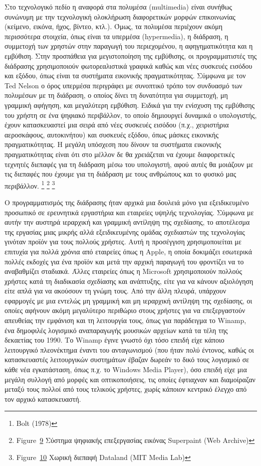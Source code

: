 \documentclass[
]{article}
\begin{document}
Στο τεχνολογικό πεδίο η αναφορά στα πολυμέσα (multimedia) είναι συνήθως
συνώνυμη με την τεχνολογική ολοκλήρωση διαφορετικών μορφών επικοινωνίας
(κείμενο, εικόνα, ήχος, βίντεο, κτλ.). Όμως, τα πολυμέσα περιέχουν ακόμη
περισσότερα στοιχεία, όπως είναι τα υπερμέσα (hypermedia), η διάδραση, η
συμμετοχή των χρηστών στην παραγωγή του περιεχομένου, η αφηγηματικότητα
και η εμβύθιση. Στην προσπάθεια για μεγιστοποίηση της εμβύθισης, οι
προγραμματιστές της διάδρασης χρησιμοποιούν φωτορεαλιστικά γραφικά καθώς
και νέες συσκευές εισόδου και εξόδου, όπως είναι τα συστήματα εικονικής
πραγματικότητας. Σύμφωνα με τον Ted Nelson ο όρος υπερμέσα περιγράφει με
συνοπτικό τρόπο τον συνδυασμό των πολυμέσων με τη διάδραση, ο οποίος
δίνει τη δυνατότητα για συμμετοχή, μη γραμμική αφήγηση, και μεγαλύτερη
εμβύθιση. Ειδικά για την ενίσχυση της εμβύθισης του χρήστη σε ένα
ψηφιακό περιβάλλον, το οποίο δημιουργεί δυναμικά ο υπολογιστής, έχουν
κατασκευαστεί μια σειρά από νέες συσκευές εισόδου (π.χ., χειριστήρια
αεροσκάφους, αυτοκινήτου) και συσκευές εξόδου, όπως μάσκες εικονικής
πραγματικότητας. Η μεγάλη υπόσχεση που δίνουν τα συστήματα εικονικής
πραγματικότητας είναι ότι στο μέλλον δε θα χρειάζεται να έχουμε
διαφορετικές τεχνητές διεπαφές για τη διάδραση μέσω του υπολογιστή, αφού
αυτές θα μοιάζουν με τις διεπαφές που έχουμε για τη διάδραση με τους
ανθρώπους και το φυσικό μας περιβάλλον. \footnote{Bolt (1978)}
\footnote{Figure~\protect\hyperlink{fig:superpaint-setup}{9} Σύστημα
  ψηφιακής επεξεργασίας εικόνας Superpaint (Web Archive)} \footnote{Figure~\protect\hyperlink{fig:dataland}{10}
  Χωρική διεπαφή Dataland (MIT Media Lab)}

Ο προγραμματισμός της διάδρασης ήταν αρχικά μια δουλειά μόνο για
εξειδικευμένο προσωπικό σε ερευνητικά εργαστήρια και εταιρείες υψηλής
τεχνολογίας. Σύμφωνα με αυτήν την αυστηρά ιεραρχική και γραμμική
αντίληψη της σχεδίασης, το αποτέλεσμα της εργασίας μιας μικρής αλλά
εξειδικευμένης ομάδας σχεδιαστών της τεχνολογίας γινόταν προϊόν για τους
πολλούς χρήστες. Αυτή η προσέγγιση χρησιμοποιείται με επιτυχία για πολλά
χρόνια από εταιρείες όπως η Apple, η οποία δοκιμάζει εσωτερικά πολλές
εκδοχές για ένα προϊόν και μετά την αρχική παραγωγή του φροντίζει να το
αναβαθμίζει σταδιακά. Άλλες εταιρείες όπως η Microsoft χρησιμοποιούν
πολλούς χρήστες κατά τη διαδικασία σχεδίασης και ανάπτυξης, είτε για να
κάνουν αξιολόγηση είτε απλά για να ακούσουν τη γνώμη τους. Από την άλλη
πλευρά, υπάρχουν εφαρμογές με μια εντελώς μη γραμμική και μη ιεραρχική
αντίληψη της σχεδίασης, οι οποίες αφήνουν ακόμη μεγαλύτερο περιθώριο
στους χρήστες για να επεξεργαστούν απευθείας την εμφάνιση και τη
λειτουργία τους, όπως για παράδειγμα το Winamp, ένα δημοφιλές λογισμικό
αναπαραγωγής μουσικών αρχείων κατά τα τέλη της δεκαετίας του 1990. Το
Winamp έγινε γνωστό όχι τόσο επειδή είχε κάποιο λειτουργικό πλεονέκτημα
έναντι του ανταγωνισμού (που ήταν πολύ έντονος, καθώς οι κατασκευαστές
λειτουργικών συστημάτων έβαζαν δωρεάν το δικό τους λογισμικό σε κάθε νέα
εγκατάσταση, όπως π.χ. το Windows Media Player), όσο επειδή είχε μια
μεγάλη συλλογή από μορφές και οπτικοποιήσεις, τις οποίες έφτιαχναν και
διαμοίραζαν μεταξύ τους πολλοί από τους τελικούς χρήστες, χωρίς κάποιον
κεντρικό έλεγχο από τον αρχικό κατασκευαστή.
\end{document}
